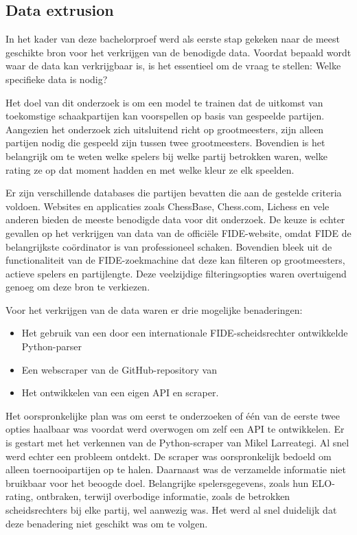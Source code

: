 \subsection{Data extrusion}

In het kader van deze bachelorproef werd als eerste stap gekeken naar de meest geschikte bron voor het verkrijgen van de benodigde data. Voordat bepaald wordt waar de data kan verkrijgbaar is, is het essentieel om de vraag te stellen: Welke specifieke data is nodig?

Het doel van dit onderzoek is om een model te trainen dat de uitkomst van toekomstige schaakpartijen kan voorspellen op basis van gespeelde partijen. Aangezien het onderzoek zich uitsluitend richt op grootmeesters, zijn alleen partijen nodig die gespeeld zijn tussen twee grootmeesters. Bovendien is het belangrijk om te weten welke spelers bij welke partij betrokken waren, welke rating ze op dat moment hadden en met welke kleur ze elk speelden.

Er zijn verschillende databases die partijen bevatten die aan de gestelde criteria voldoen. Websites en applicaties zoals ChessBase, Chess.com, Lichess en vele anderen bieden de meeste benodigde data voor dit onderzoek. De keuze is echter gevallen op het verkrijgen van data van de officiële FIDE-website, omdat FIDE de belangrijkste coördinator is van professioneel schaken. Bovendien bleek uit de functionaliteit van de FIDE-zoekmachine dat deze kan filteren op grootmeesters, actieve spelers en partijlengte. Deze veelzijdige filteringsopties waren overtuigend genoeg om deze bron te verkiezen.

Voor het verkrijgen van de data waren er drie mogelijke benaderingen:
\begin{itemize}
    \item Het gebruik van een door een internationale FIDE-scheidsrechter ontwikkelde Python-parser \autocite{Larreategi}
    \item Een webscraper van de GitHub-repository van \textcite{Alves2020}
    \item Het ontwikkelen van een eigen API en scraper.
\end{itemize}
Het oorspronkelijke plan was om eerst te onderzoeken of één van de eerste twee opties haalbaar was voordat werd overwogen om zelf een API te ontwikkelen. Er is gestart met het verkennen van de Python-scraper van Mikel Larreategi. Al snel werd echter een probleem ontdekt. De scraper was oorspronkelijk bedoeld om alleen toernooipartijen op te halen. Daarnaast was de verzamelde informatie niet bruikbaar voor het beoogde doel. Belangrijke spelersgegevens, zoals hun ELO-rating, ontbraken, terwijl overbodige informatie, zoals de betrokken scheidsrechters bij elke partij, wel aanwezig was. Het werd al snel duidelijk dat deze benadering niet geschikt was om te volgen.

